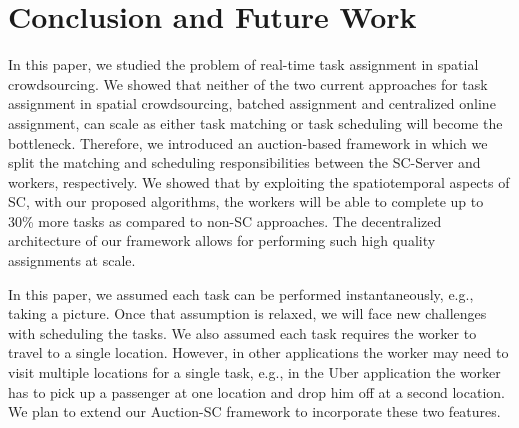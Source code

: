 \section{Conclusion and Future Work}
\label{sec:future}

In this paper, we studied the problem of real-time task assignment in spatial crowdsourcing. We showed that neither of the two current approaches for task assignment in spatial crowdsourcing, batched assignment and centralized online assignment, can scale as either task matching or task scheduling will become the bottleneck. Therefore, we introduced an auction-based framework in which we split the matching and scheduling responsibilities between the SC-Server and workers, respectively. We showed that by exploiting the spatiotemporal aspects of SC, with our proposed algorithms, the workers will be able to complete up to 30\% more tasks as compared to non-SC approaches. The decentralized architecture of our framework allows for performing such high quality assignments at scale.

In this paper, we assumed each task can be performed instantaneously, e.g., taking a picture. Once that assumption is relaxed, we will face new challenges with scheduling the tasks. We also assumed each task requires the worker to travel to a single location. However, in other applications the worker may need to visit multiple locations for a single task, e.g., in the Uber application the worker has to pick up a passenger at one location and drop him off at a second location. We plan to extend our Auction-SC framework to incorporate these two features.
